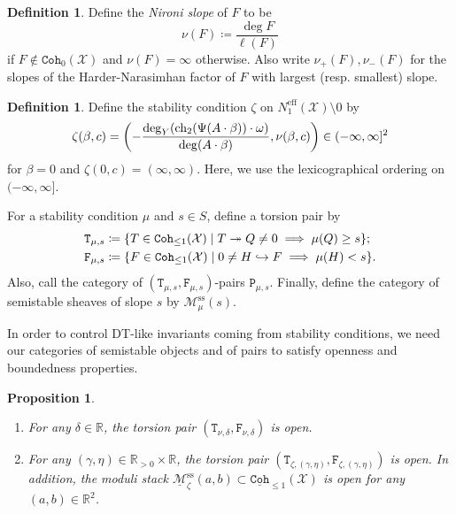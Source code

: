 \documentclass[leqno, openany]{memoir}
\newtheorem{prop}[thm]{Proposition}
\theoremstyle{definition}
\newtheorem{defn}[thm]{Definition}
\theoremstyle{remark}
\theoremstyle{plain}
\theoremstyle{definition}
\theoremstyle{remark}
\newcommand{\R}{\mathbb{R}}
\newcommand{\mc}[1]{\mathcal{#1}}
\newcommand{\mr}[1]{\mathrm{#1}}
\newcommand{\mt}[1]{\mathtt{#1}}
\newcommand{\on}[1]{\operatorname{#1}}
\newcommand{\ul}[1]{\underline{#1}}
\begin{document}
\begin{defn}
    Define the \textit{Nironi slope} of $F$ to be
    \[ \nu(F) \coloneqq \frac{\deg F}{\ell(F)} \]
    if $F \notin \mt{Coh}_0(\mc{X})$ and $\nu(F) = \infty$ otherwise. Also write $\nu_+(F), \nu_-(F)$ for the slopes of the Harder-Narasimhan factor of $F$ with largest (resp. smallest) slope.
\end{defn}

\begin{defn}
    Define the stability condition $\zeta$ on $N_1^{\mr{eff}}(\mc{X}) \setminus 0$ by
    \[ \zeta(\beta, c) = \qty(- \frac{\deg_Y(\on{ch_2}(\Psi(A \cdot \beta)) \cdot \omega)}{\deg(A \cdot \beta)}, \nu(\beta, c)) \in (-\infty, \infty]^2 \]
    for $\beta = 0$ and $\zeta(0, c) = (\infty, \infty)$. Here, we use the lexicographical ordering on $(-\infty, \infty]$.
\end{defn}

For a stability condition $\mu$ and $s \in S$, define a torsion pair by 
\begin{align*}
    \mt{T}_{\mu, s} &\coloneqq \qty{T \in \mt{Coh}_{\leq 1}(\mc{X}) \mid T \twoheadrightarrow Q \neq 0 \implies \mu(Q) \geq s}; \\
    \mt{F}_{\mu, s} &\coloneqq \qty{F \in \mt{Coh}_{\leq 1}(\mc{X}) \mid 0 \neq H \hookrightarrow F \implies \mu(H) < s}.
\end{align*}
Also, call the category of $(\mt{T}_{\mu, s}, \mt{F}_{\mu, s})$-pairs $\mt{P}_{\mu, s}$. Finally, define the category of semistable sheaves of slope $s$ by $\mc{M}_{\mu}^{\mr{ss}}(s)$.

In order to control DT-like invariants coming from stability conditions, we need our categories of semistable objects and of pairs to satisfy openness and boundedness properties. 

\begin{prop}\leavevmode
    \begin{enumerate}
        \item For any $\delta \in \R$, the torsion pair $(\mt{T}_{\nu,\delta}, \mt{F}_{\nu, \delta})$ is open.
        \item For any $(\gamma, \eta) \in \R_{>0} \times \R$, the torsion pair $(\mt{T}_{\zeta, (\gamma,\eta)}, \mt{F}_{\zeta, (\gamma,\eta)})$ is open. In addition, the moduli stack $\ul{\mc{M}}_{\zeta}^{\mr{ss}}(a,b) \subset \mt{\ul{Coh}}_{\leq 1}(\mc{X})$ is open for any $(a,b) \in \R^2$.
    \end{enumerate}
\end{prop}
\end{document}
